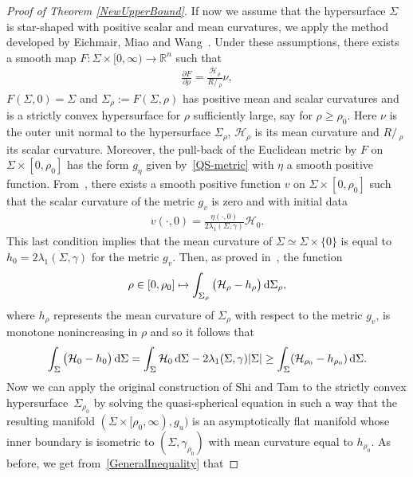 \documentclass[pdftex]{sigma}
\numberwithin{equation}{section}
\def\Ss{R\!\!\!\!/\,}
\begin{document}
\begin{proof}[Proof of Theorem \ref{NewUpperBound}]
If now we assume that the hypersurface $\Sigma$ is star-shaped with positive scalar and mean curvatures, we apply the method developed by Eichmair, Miao and Wang~\cite{EichmairMiaoWang}. Under these assumptions, there exists a smooth map $F\colon\Sigma\times[0,\infty)\rightarrow \mathbb{R}^n$ such that
\begin{gather*}
\frac{\partial F}{\partial \rho}=\frac{\mathcal{H}_\rho}{\Ss_\rho}\nu,
\end{gather*}
$F(\Sigma,0)=\Sigma$ and $\Sigma_\rho:=F(\Sigma,\rho)$ has positive mean and scalar curvatures and is a strictly convex hypersurface for $\rho$ sufficiently large, say for $\rho\geq \rho_0$. Here $\nu$ is the outer unit normal to the hypersurface $\Sigma_\rho$, $\mathcal{H}_\rho$ is its mean curvature and $\Ss_\rho$ its scalar curvature. Moreover, the pull-back of the Euclidean metric by $F$ on $\Sigma\times[0,\rho_0]$ has the form $g_\eta$ given by~\eqref{QS-metric} with $\eta$ a smooth positive function. From~\cite[Proposition 2]{EichmairMiaoWang}, there exists a smooth positive function $v$ on $\Sigma\times [0,\rho_0]$ such that the scalar curvature of the metric $g_v$
is zero and with initial data
\begin{gather*}
v(\cdot,0)=\frac{\eta(\cdot,0)}{2\lambda_1(\Sigma,\gamma)}\mathcal{H}_0.
\end{gather*}
This last condition implies that the mean curvature of $\Sigma\simeq\Sigma\times\{0\}$ is equal to $h_0=2\lambda_1(\Sigma,\gamma)$ for the metric $g_v$.
Then, as proved in~\cite[Proposition~3]{EichmairMiaoWang}, the function
\begin{gather*}
\rho\in[0,\rho_0]\mapsto\int_{\Sigma_\rho}\big(\mathcal{H}_\rho-h_\rho\big)\,{\rm d}\Sigma_\rho,
\end{gather*}
where $h_\rho$ represents the mean curvature of $\Sigma_\rho$ with respect to the metric $g_v$, is monotone nonincreasing in $\rho$ and so it follows that
\begin{gather}\label{Monotone1}
\int_{\Sigma}\big(\mathcal{H}_0-h_0\big)\,{\rm d}\Sigma=\int_{\Sigma}\mathcal{H}_0\,{\rm d}\Sigma-2\lambda_1(\Sigma,\gamma)|\Sigma| \geq \int_{\Sigma}(\mathcal{H}_{\rho_0}-h_{\rho_0})\,{\rm d}\Sigma.
\end{gather}
Now we can apply the original construction of Shi and Tam to the strictly convex hypersurface~$\Sigma_{\rho_0}$ by solving the quasi-spherical equation in such a way that the resulting manifold $(\Sigma\times[\rho_0,\infty),g_u)$ is an asymptotically flat manifold whose inner boundary is isometric to $(\Sigma,\gamma_{\rho_0})$ with mean curvature equal to $h_{\rho_0}$. As before, we get from~\eqref{GeneralInequality} that

\end{proof}
\end{document}
